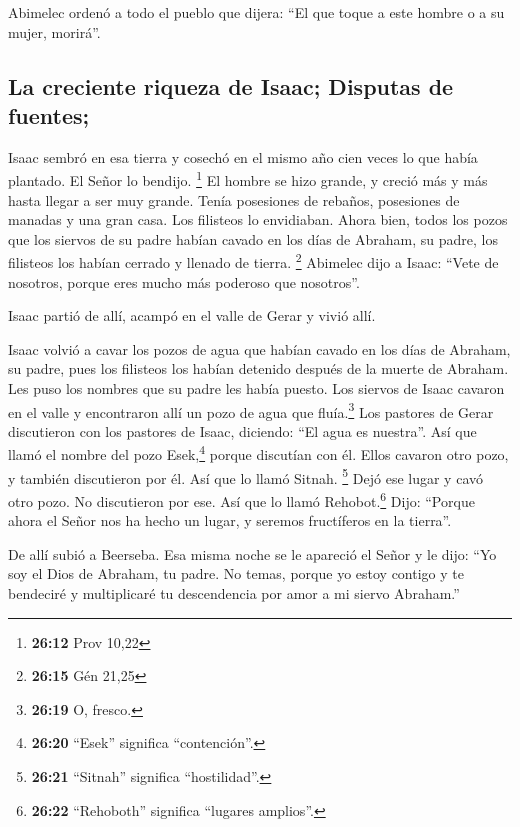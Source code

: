 Abimelec ordenó a todo el pueblo que dijera: ``El que
toque a este hombre o a su mujer, morirá''.

\hypertarget{la-creciente-riqueza-de-isaac-disputas-de-fuentes}{%
\subsection{La creciente riqueza de Isaac; Disputas de
fuentes;}\label{la-creciente-riqueza-de-isaac-disputas-de-fuentes}}

 Isaac sembró en esa tierra y cosechó en el mismo año
cien veces lo que había plantado. El Señor lo bendijo. \footnote{\textbf{26:12}
  Prov 10,22}  El hombre se hizo grande, y creció más y
más hasta llegar a ser muy grande.  Tenía posesiones de
rebaños, posesiones de manadas y una gran casa. Los filisteos lo
envidiaban.  Ahora bien, todos los pozos que los siervos
de su padre habían cavado en los días de Abraham, su padre, los
filisteos los habían cerrado y llenado de tierra. \footnote{\textbf{26:15}
  Gén 21,25}  Abimelec dijo a Isaac: ``Vete de nosotros,
porque eres mucho más poderoso que nosotros''.

 Isaac partió de allí, acampó en el valle de Gerar y
vivió allí.

 Isaac volvió a cavar los pozos de agua que habían cavado
en los días de Abraham, su padre, pues los filisteos los habían detenido
después de la muerte de Abraham. Les puso los nombres que su padre les
había puesto.  Los siervos de Isaac cavaron en el valle y
encontraron allí un pozo de agua que fluía.\footnote{\textbf{26:19} O,
  fresco.}  Los pastores de Gerar discutieron con los
pastores de Isaac, diciendo: ``El agua es nuestra''. Así que llamó el
nombre del pozo Esek,\footnote{\textbf{26:20} ``Esek'' significa
  ``contención''.} porque discutían con él.  Ellos
cavaron otro pozo, y también discutieron por él. Así que lo llamó
Sitnah. \footnote{\textbf{26:21} ``Sitnah'' significa ``hostilidad''.}
 Dejó ese lugar y cavó otro pozo. No discutieron por ese.
Así que lo llamó Rehobot.\footnote{\textbf{26:22} ``Rehoboth'' significa
  ``lugares amplios''.} Dijo: ``Porque ahora el Señor nos ha hecho un
lugar, y seremos fructíferos en la tierra''.

 De allí subió a Beerseba.  Esa misma
noche se le apareció el Señor y le dijo: ``Yo soy el Dios de Abraham, tu
padre. No temas, porque yo estoy contigo y te bendeciré y multiplicaré
tu descendencia por amor a mi siervo Abraham.''

